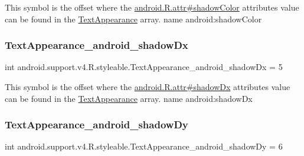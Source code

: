 This symbol is the offset where the \hyperlink{}{android.\+R.\+attr\#shadow\+Color} attribute\textquotesingle{}s value can be found in the \hyperlink{classandroid_1_1support_1_1v4_1_1R_1_1styleable_a81c402d7a6e327c354a1cf72b21fc4f5}{Text\+Appearance} array.  name android\+:shadow\+Color \mbox{\label{classandroid_1_1support_1_1v4_1_1R_1_1styleable_aede7737f192898cea28cfa504def7c4c}} 
\subsubsection{\texorpdfstring{Text\+Appearance\+\_\+android\+\_\+shadow\+Dx}{TextAppearance\_android\_shadowDx}}
{\footnotesize\ttfamily int android.\+support.\+v4.\+R.\+styleable.\+Text\+Appearance\+\_\+android\+\_\+shadow\+Dx = 5\hspace{0.3cm}{\ttfamily [static]}}

This symbol is the offset where the \hyperlink{}{android.\+R.\+attr\#shadow\+Dx} attribute\textquotesingle{}s value can be found in the \hyperlink{classandroid_1_1support_1_1v4_1_1R_1_1styleable_a81c402d7a6e327c354a1cf72b21fc4f5}{Text\+Appearance} array.  name android\+:shadow\+Dx \mbox{\label{classandroid_1_1support_1_1v4_1_1R_1_1styleable_ad8fae45d7f1f386895cd3d3387477bb8}} 
\subsubsection{\texorpdfstring{Text\+Appearance\+\_\+android\+\_\+shadow\+Dy}{TextAppearance\_android\_shadowDy}}
{\footnotesize\ttfamily int android.\+support.\+v4.\+R.\+styleable.\+Text\+Appearance\+\_\+android\+\_\+shadow\+Dy = 6\hspace{0.3cm}{\ttfamily [static]}}

